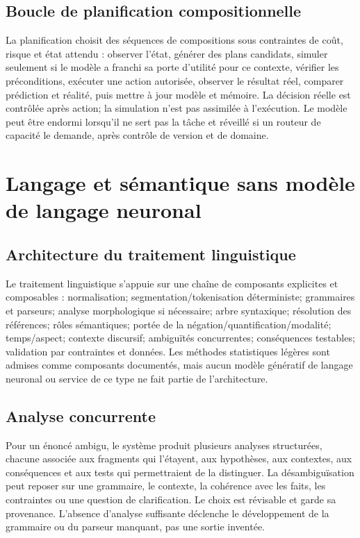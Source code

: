 \documentclass[11pt,a4paper]{article}
\begin{document}
\subsection{Boucle de planification compositionnelle}
La planification choisit des séquences de compositions sous contraintes de coût, risque et état attendu : observer l'état, générer des plans candidats, simuler seulement si le modèle a franchi sa porte d'utilité pour ce contexte, vérifier les préconditions, exécuter une action autorisée, observer le résultat réel, comparer prédiction et réalité, puis mettre à jour modèle et mémoire. La décision réelle est contrôlée après action; la simulation n'est pas assimilée à l'exécution. Le modèle peut être endormi lorsqu'il ne sert pas la tâche et réveillé si un routeur de capacité le demande, après contrôle de version et de domaine.

\section{Langage et sémantique sans modèle de langage neuronal}
\subsection{Architecture du traitement linguistique}
Le traitement linguistique s'appuie sur une chaîne de composants explicites et composables : normalisation; segmentation/tokenisation déterministe; grammaires et parseurs; analyse morphologique si nécessaire; arbre syntaxique; résolution des références; rôles sémantiques; portée de la négation/quantification/modalité; temps/aspect; contexte discursif; ambiguïtés concurrentes; conséquences testables; validation par contraintes et données. Les méthodes statistiques légères sont admises comme composants documentés, mais aucun modèle génératif de langage neuronal ou service de ce type ne fait partie de l'architecture.

\subsection{Analyse concurrente}
Pour un énoncé ambigu, le système produit plusieurs analyses structurées, chacune associée aux fragments qui l'étayent, aux hypothèses, aux contextes, aux conséquences et aux tests qui permettraient de la distinguer. La désambiguïsation peut reposer sur une grammaire, le contexte, la cohérence avec les faits, les contraintes ou une question de clarification. Le choix est révisable et garde sa provenance. L'absence d'analyse suffisante déclenche le développement de la grammaire ou du parseur manquant, pas une sortie inventée.
\end{document}
